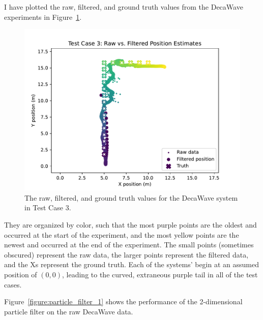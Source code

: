 I have plotted the raw, filtered, and ground truth values from the DecaWave experiments
in Figure~\ref{figure:test3_decawave_and_ground_truth}.
\begin{figure}
	\centering
	\includegraphics[width=\linewidth]{./images/test3_decawave_and_ground_truth.pdf}
	\caption{The raw, filtered, and ground truth values for the DecaWave system in Test Case 3.}
	\label{figure:test3_decawave_and_ground_truth}
\end{figure}
They are organized by color, such that the most purple points are the oldest and occurred at the
start of the experiment, and the most yellow points are the newest and occurred at the end of the
experiment.
The small points (sometimes obscured) represent the raw data,
the larger points represent the filtered data,
and the Xs represent the ground truth.
Each of the systems' begin at an assumed position of $(0,0)$,
leading to the curved, extraneous purple tail in all of the test cases.

Figure~\ref{figure:particle_filter_1} shows the performance of the 2-dimensional particle filter on the
raw DecaWave data.

